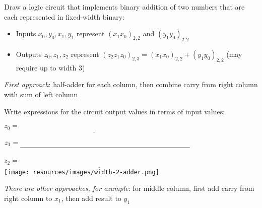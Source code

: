 \documentclass[12pt, oneside]{article}
\begin{document}
Draw a logic circuit that implements binary addition of 
two numbers that are each represented in fixed-width binary:
\begin{itemize}
\item Inputs  $x_0, y_0, x_1, y_1$ represent $(x_1  x_0)_{2,2}$ and $(y_1 y_0)_{2,2}$
\item Outputs  $z_0, z_1, z_2$ represent $(z_2  z_1 z_0)_{2,3} = (x_1  x_0)_{2,2} + (y_1 y_0)_{2,2}$ (may require up to width  $3$)
\end{itemize}

{\it First approach}: half-adder for each column, then combine carry from right column with sum of left column


Write expressions for the circuit output values in terms of input values:

$z_0 = \underline{\phantom{x_0 \oplus y_0\hspace{3in}}}$

$z_1 = \underline{\phantom{(x_1 \oplus y_1) \oplus c_0}\hspace{2.5in}}$ \phantom{where $c_0 = x_0 \land y_0$}

$z_2 = \underline{\phantom{(c_0 \land (x_1 \oplus y_1)) \oplus c_1}\hspace{2in}}$ \phantom{where $c_1 = x_1 \land y_1$}\\

\texttt{[image: resources/images/width-2-adder.png]}


\vfill

{\it There are other approaches, for example}: for middle column, first add carry from right column to $x_1$, then add result to $y_1$

\begin{comment}
Write expressions for the circuit output values in terms of input values:

$z_0 = \underline{\phantom{x_0 \oplus y_0}\hspace{3in}}$

$z_1 = \underline{ \phantom{(c_0 \oplus x_1) \oplus y_1}\hspace{2.4in}}$ \phantom{where $c_0 = x_0 \land y_0$}

$z_2 = \underline{\phantom{(c_0 \land x_1) \oplus ((c_0 \oplus x_1)\land y_1)}\hspace{1.5in}}$

\vfill

{\it Extra example} Describe how to generalize this addition circuit for larger width inputs.
\end{comment}
 \vfill
\end{document}

